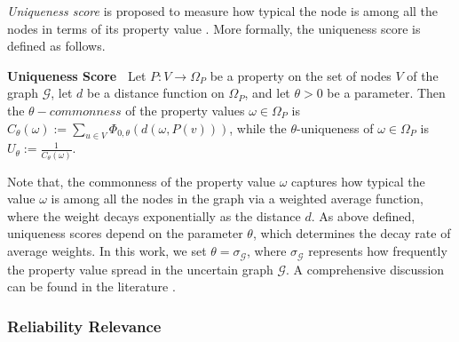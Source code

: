 \emph{Uniqueness score} is proposed to measure how typical the node is among all the nodes in terms of its property value \cite{Boldi_Injecting_2012}. More formally, the uniqueness score is defined as follows. 
\begin{definition}
    \textbf{Uniqueness Score~\cite{Boldi_Injecting_2012}}
     Let $P:V \rightarrow  \Omega_{P}$ be a property on the set of nodes $V$ of the graph $\mathcal{G}$, let $d$ be a distance function on $\Omega_{P}$, and let $\theta >0$  be a parameter. 
  Then the $\theta-commonness$ of the property values $\omega \in \Omega_{P}$ is $C_{\theta}(\omega):= \sum_{u \in V} \Phi_{0,\theta}(d(\omega, P(v)))$,   
while the $\theta$-uniqueness of $\omega \in \Omega_{P}$ is $U_{\theta}:= \frac{1}{C_{\theta}(\omega)}$. 
\end{definition} 
Note that, the commonness of the property value $\omega$ captures how typical the value $\omega$  is among all the  nodes in the graph via a weighted average function, where the weight decays exponentially as the distance $d$. As above defined, uniqueness scores depend on the parameter $\theta$, which determines the decay rate of average weights. In this work, we set $\theta=\sigma_{\mathcal{G}}$, where $\sigma_{\mathcal{G}}$ represents how frequently the property value spread in the uncertain graph $\mathcal{G}$. A comprehensive discussion can be found in the literature \cite{Boldi_Injecting_2012}.

\subsubsection{Reliability Relevance}

